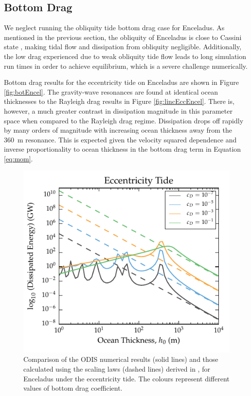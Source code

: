 \subsection{Bottom Drag}

We neglect running the obliquity tide bottom drag case for Enceladus. As mentioned in the previous section, the obliquity of Enceladus is close to Cassini state \citep{chen2011obliquity,baland2016obliquity}, making tidal flow and dissipation from obliquity negligible. Additionally, the low drag experienced due to weak obliquity tide flow leads to long simulation run times in order to achieve equilibrium, which is a severe challenge numerically.

Bottom drag results for the eccentricity tide on Enceladus are shown in Figure \ref{fig:botEncel}. The gravity-wave resonances are found at identical ocean thicknesses to the Rayleigh drag results in Figure \ref{fig:lincEccEncel}. There is, however, a much greater contrast in dissipation magnitude in this parameter space when compared to the Rayleigh drag regime. Dissipation drops off rapidly by many orders of magnitude with increasing ocean thickness away from the \SI{360}{\metre} resonance. This is expected given the velocity squared dependence and inverse proportionality to ocean thickness in the bottom drag term in Equation \ref{eq:mom}. 

\begin{figure}[!t]
\centering
\includegraphics[width=0.85\linewidth]{Figures/enceladus_scaling}
\caption{Comparison of the ODIS numerical results (solid lines) and those calculated using the scaling laws (dashed lines) derived in \citet{chen2013tidal}, for Enceladus under the eccentricity tide. The colours represent different values of bottom drag coefficient. \label{fig:scalEncel}}
\end{figure}

